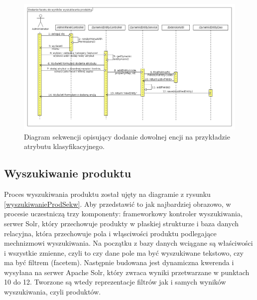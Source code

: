   \begin{figure}
 	\begin{center}
 		\includegraphics[scale=0.38]{dodanieFacetu.png}
 	\end{center}
 	\caption{{\color{black}Diagram sekwencji opisujący dodanie dowolnej encji na przykładzie atrybutu klasyfikacyjnego.}} \label{dodanieFacetu}
 \end{figure}

\subsection{Wyszukiwanie produktu}
Proces wyszukiwania produktu został ujęty na diagramie z rysunku \ref{wyszukiwanieProdSekw}. Aby przedstawić to jak najbardziej obrazowo, w procesie uczestniczą trzy komponenty: frameworkowy kontroler wyszukiwania, serwer Solr, który przechowuje produkty w płaskiej strukturze i baza danych relacyjna, która przechowuje pola i włąsciwości produktu podlegające mechnizmowi wyszukiwania. Na początku z bazy danych wciągane są właściwości i wszystkie zmienne, czyli to czy dane pole ma być wyszukiwane tekstowo, czy ma być filtrem (facetem). Następnie budowana jest dynamiczna kwerenda i wysyłana na serwer Apache Solr, który zwraca wyniki przetwarzane w punktach 10 do 12. Tworzone są wtedy reprezentacje filtrów jak i samych wyników wyszukiwania, czyli produktów. 

